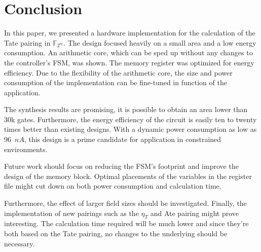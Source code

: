 \section{Conclusion\label{section-conclussion}}

In this paper, we presented a hardware implementation for the calculation of the Tate pairing in $\mathbb{F}_{2^m}$. The design focused heavily on a small area and a low energy consumption. An arithmetic core, which can be sped up without any changes to the controller's FSM, was shown. The memory register was optimized for energy efficiency. Due to the flexibility of the arithmetic core, the size and power consumption of the implementation can be fine-tuned in function of the application.

The synthesis results are promising, it is possible to obtain an area lower than 30k gates. Furthermore, the energy efficiency of the circuit is easily ten to twenty times better than existing designs. With a dynamic power consumption as low as 96~$nA$, this design is a prime candidate for application in constrained environments.

Future work should focus on reducing the FSM's footprint and improve the design of the memory block. Optimal placements of the variables in the register file might cut down on both power consumption and calculation time.

Furthermore, the effect of larger field sizes should be investigated. Finally, the implementation of new pairings such as the $\eta_T$ and Ate pairing might prove interesting. The calculation time required will be much lower and since they're both based on the Tate pairing, no changes to the underlying should be necessary.
